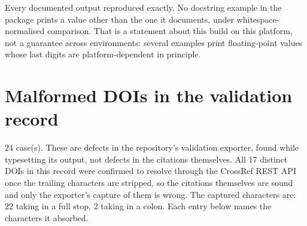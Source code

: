 \documentclass[10pt,a4paper,twoside]{report}
\begin{document}
Every documented output reproduced exactly. No docstring example in the package prints a value other than the one it documents, under whitespace-normalised comparison. That is a statement about this build on this platform, not a guarantee across environments: several examples print floating-point values whose last digits are platform-dependent in principle.

\section{Malformed DOIs in the validation record}

24 case(s). These are defects in the repository's validation exporter, found while typesetting its output, not defects in the citations themselves. All 17 distinct DOIs in this record were confirmed to resolve through the CrossRef REST API once the trailing characters are stripped, so the citations themselves are sound and only the exporter's capture of them is wrong. The captured characters are: 22 taking in a full stop, 2 taking in a colon. Each entry below names the characters it absorbed.
\end{document}
